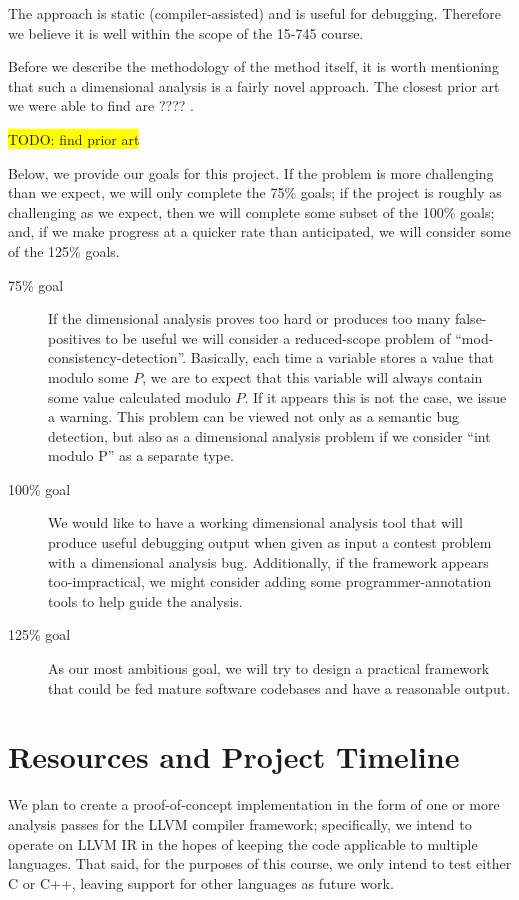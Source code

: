 \documentclass[12pt]{article}
\begin{document}
The approach is static (compiler-assisted) and is useful for debugging. Therefore we believe it is well within the scope of the 15-745 course.

Before we describe the methodology of the method itself, it is worth mentioning that such a dimensional analysis is a fairly novel approach. The closest prior art we were able to find are ???? \cite{hilfinger1988ada}. %

\colorbox{yellow}{TODO: find prior art}

Below, we provide our goals for this project. If the problem is more challenging than we expect, we will only complete the 75\% goals; if the project is roughly as challenging as we expect, then we will complete some subset of the 100\% goals; and, if we make progress at a quicker rate than anticipated, we will consider some of the 125\% goals.
\begin{description}
\item [75\% goal] If the dimensional analysis proves too hard or produces too many false-positives to be useful we will consider a reduced-scope problem of ``mod-consistency-detection''. Basically, each time a variable stores a value that modulo some $P$, we are to expect that this variable will always contain some value calculated modulo $P$. If it appears this is not the case, we issue a warning. This problem can be viewed not only as a semantic bug detection, but also as a dimensional analysis problem if we consider ``int modulo P'' as a separate type.

\item [100\% goal] We would like to have a working dimensional analysis tool that will produce useful debugging output when given as input a contest problem with a dimensional analysis bug. Additionally, if the framework appears too-impractical, we might consider adding some programmer-annotation tools to help guide the analysis. 

\item [125\% goal] As our most ambitious goal, we will try to design a practical framework that could be fed mature software codebases and have a reasonable output.
\end{description}

\section{Resources and Project Timeline}

We plan to create a proof-of-concept implementation in the form of one or more analysis passes for the LLVM compiler framework; specifically, we intend to operate on LLVM IR in the hopes of keeping the code applicable to multiple languages.
That said, for the purposes of this course, we only intend to test either C or C++, leaving support for other languages as future work.
\end{document}
